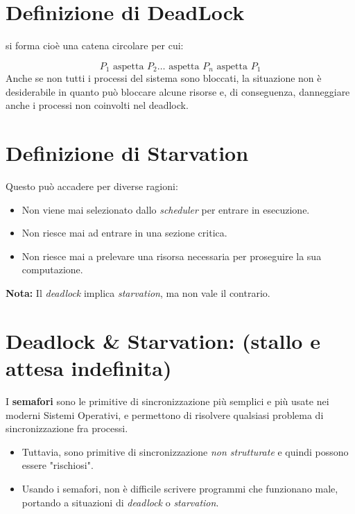 \section{Definizione di DeadLock}
 si forma cioè una catena circolare per cui:

\[
P_1 \text{ aspetta } P_2 \dots \text{ aspetta } P_n \text{ aspetta } P_1
\]
Anche se non tutti i processi del sistema sono bloccati, la situazione non è desiderabile in quanto può bloccare alcune risorse e, di conseguenza, danneggiare anche i processi non coinvolti nel deadlock.




\section{Definizione di Starvation}
 Questo può accadere per diverse ragioni:

\begin{itemize}
    \item Non viene mai selezionato dallo \textit{scheduler} per entrare in esecuzione.
    \item Non riesce mai ad entrare in una sezione critica.
    \item Non riesce mai a prelevare una risorsa necessaria per proseguire la sua computazione.
\end{itemize}

\textbf{Nota:} Il \textit{deadlock} implica \textit{starvation}, ma non vale il contrario.

\section{Deadlock \& Starvation: (stallo e attesa indefinita)}
I \textbf{semafori} sono le primitive di sincronizzazione più semplici e più usate nei moderni Sistemi Operativi, e permettono di risolvere qualsiasi problema di sincronizzazione fra processi.

\begin{itemize}
    \item Tuttavia, sono primitive di sincronizzazione \textit{non strutturate} e quindi possono essere "rischiosi".
    \item Usando i semafori, non è difficile scrivere programmi che funzionano male, portando a situazioni di \textit{deadlock} o \textit{starvation}.
\end{itemize}

